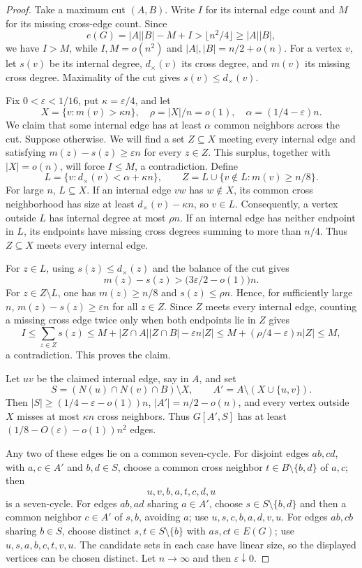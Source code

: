 \documentclass[10pt]{article}
\theoremstyle{remark}
\begin{document}
\begin{proof}
Take a maximum cut $(A,B)$. Write $I$ for its internal edge count and $M$ for its missing cross-edge count. Since
\[
 e(G)=|A||B|-M+I>\lfloor n^2/4\rfloor\ge |A||B|,
\]
we have $I>M$, while $I,M=o(n^2)$ and $|A|,|B|=n/2+o(n)$. For a vertex $v$, let $s(v)$ be its internal degree, $d_\times(v)$ its cross degree, and $m(v)$ its missing cross degree. Maximality of the cut gives $s(v)\le d_\times(v)$.

Fix $0<\varepsilon<1/16$, put $\kappa=\varepsilon/4$, and let
\[
 X=\{v:m(v)>\kappa n\},\quad \rho=|X|/n=o(1),\quad
 \alpha=(1/4-\varepsilon)n.
\]
We claim that some internal edge has at least $\alpha$ common neighbors across the cut. Suppose otherwise. We will find a set $Z\subseteq X$ meeting every internal edge and satisfying $m(z)-s(z)\ge\varepsilon n$ for every $z\in Z$. This surplus, together with $|X|=o(n)$, will force $I\le M$, a contradiction. Define
\[
 L=\{v:d_\times(v)<\alpha+\kappa n\},\qquad
 Z=L\cup\{v\notin L:m(v)\ge n/8\}.
\]
For large $n$, $L\subseteq X$. If an internal edge $vw$ has $w\notin X$, its common cross neighborhood has size at least $d_\times(v)-\kappa n$, so $v\in L$. Consequently, a vertex outside $L$ has internal degree at most $\rho n$. If an internal edge has neither endpoint in $L$, its endpoints have missing cross degrees summing to more than $n/4$. Thus $Z\subseteq X$ meets every internal edge.

For $z\in L$, using $s(z)\le d_\times(z)$ and the balance of the cut gives
\[
 m(z)-s(z)>\bigl(3\varepsilon/2-o(1)\bigr)n.
\]
For $z\in Z\setminus L$, one has $m(z)\ge n/8$ and $s(z)\le\rho n$. Hence, for sufficiently large $n$, $m(z)-s(z)\ge\varepsilon n$ for all $z\in Z$. Since $Z$ meets every internal edge, counting a missing cross edge twice only when both endpoints lie in $Z$ gives
\[
 I\le\sum_{z\in Z}s(z)
 \le M+|Z\cap A||Z\cap B|-\varepsilon n|Z|
 \le M+(\rho/4-\varepsilon)n|Z|\le M,
\]
a contradiction. This proves the claim.

Let $uv$ be the claimed internal edge, say in $A$, and set
\[
 S=(N(u)\cap N(v)\cap B)\setminus X,\qquad
 A'=A\setminus(X\cup\{u,v\}).
\]
Then $|S|\ge(1/4-\varepsilon-o(1))n$, $|A'|=n/2-o(n)$, and every vertex outside $X$ misses at most $\kappa n$ cross neighbors. Thus $G[A',S]$ has at least $(1/8-O(\varepsilon)-o(1))n^2$ edges.

Any two of these edges lie on a common seven-cycle. For disjoint edges $ab,cd$, with $a,c\in A'$ and $b,d\in S$, choose a common cross neighbor $t\in B\setminus\{b,d\}$ of $a,c$; then
\[
 u,v,b,a,t,c,d,u
\]
is a seven-cycle. For edges $ab,ad$ sharing $a\in A'$, choose $s\in S\setminus\{b,d\}$ and then a common neighbor $c\in A'$ of $s,b$, avoiding $a$; use $u,s,c,b,a,d,v,u$. For edges $ab,cb$ sharing $b\in S$, choose distinct $s,t\in S\setminus\{b\}$ with $as,ct\in E(G)$; use $u,s,a,b,c,t,v,u$. The candidate sets in each case have linear size, so the displayed vertices can be chosen distinct. Let $n\to\infty$ and then $\varepsilon\downarrow0$.
\end{proof}
\end{document}
